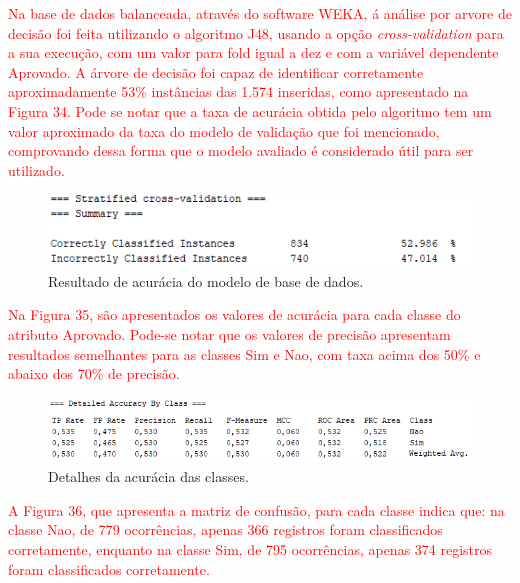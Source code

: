 \par
\textcolor{red}{Na base de dados balanceada, através do software WEKA, á análise por arvore de decisão foi feita utilizando o algoritmo J48, usando a opção \textit{cross-validation} para a sua execução, com um valor para fold igual a dez e com a variável dependente Aprovado. A árvore de decisão foi capaz de identificar corretamente aproximadamente 53\% instâncias das 1.574 inseridas, como apresentado na Figura 34. Pode se notar que a taxa de acurácia obtida pelo algoritmo tem um valor aproximado da taxa do modelo de validação que foi mencionado, comprovando dessa forma que o modelo avaliado é considerado útil para ser utilizado.}

\par
\begin{figure}[!htp]
	\begin{center}
    \caption{\label{fig:waveform_fig} Resultado de acurácia do modelo de base de dados.}
	\includegraphics[scale=0.99]{Figuras/Resultado_acuracia.png}
	\end{center}
\end{figure}

\par
\textcolor{red}{Na Figura 35, são apresentados os valores de acurácia para cada classe do atributo Aprovado. Pode-se notar que os valores de precisão apresentam resultados semelhantes para as classes Sim e Nao, com taxa acima dos 50\% e abaixo dos 70\% de precisão.}

\par
\begin{figure}[!htp]
	\begin{center}
    \caption{\label{fig:waveform_fig} Detalhes da acurácia das classes.}
	\includegraphics[scale=0.93]{Figuras/Tabela_de_acuracia_das_classes.png}
	\end{center}
\end{figure}

\textcolor{red}{A Figura 36, que apresenta a matriz de confusão, para cada classe indica que: na classe Nao, de 779 ocorrências, apenas 366 registros foram classificados corretamente, enquanto na classe Sim, de 795 ocorrências, apenas 374 registros foram classificados corretamente.}

